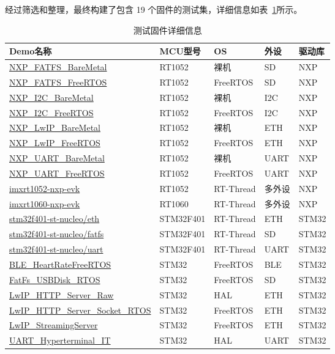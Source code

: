 经过筛选和整理，最终构建了包含 19 个固件的测试集，详细信息如表~\ref{tab:firmware}所示。

\begin{table}[htbp]
\centering
\caption{测试固件详细信息}
\label{tab:firmware}
\scriptsize
\begin{tabularx}{\textwidth}{>{\raggedright\arraybackslash}X p{2.0cm} p{1.5cm} >{\raggedright\arraybackslash}p{1.5cm} >{\raggedright\arraybackslash}p{1.5cm}}
\toprule
\textbf{Demo名称} & \textbf{MCU型号} & \textbf{OS} & \textbf{外设} & \textbf{驱动库} \\
\midrule
\url{NXP_FATFS_BareMetal} & RT1052 & 裸机 & SD & NXP \\
\url{NXP_FATFS_FreeRTOS} & RT1052 & FreeRTOS & SD & NXP \\
\url{NXP_I2C_BareMetal} & RT1052 & 裸机 & I2C & NXP \\
\url{NXP_I2C_FreeRTOS} & RT1052 & FreeRTOS & I2C & NXP \\
\url{NXP_LwIP_BareMetal} & RT1052 & 裸机 & ETH & NXP \\
\url{NXP_LwIP_FreeRTOS} & RT1052 & FreeRTOS & ETH & NXP \\
\url{NXP_UART_BareMetal} & RT1052 & 裸机 & UART & NXP \\
\url{NXP_UART_FreeRTOS} & RT1052 & FreeRTOS & UART & NXP \\
\url{imxrt1052-nxp-evk} & RT1052 & RT-Thread & 多外设 & NXP \\
\url{imxrt1060-nxp-evk} & RT1060 & RT-Thread & 多外设 & NXP \\
\url{stm32f401-st-nucleo/eth} & STM32F401 & RT-Thread & ETH & STM32 \\
\url{stm32f401-st-nucleo/fatfs} & STM32F401 & RT-Thread & SD & STM32 \\
\url{stm32f401-st-nucleo/uart} & STM32F401 & RT-Thread & UART & STM32 \\
\url{BLE_HeartRateFreeRTOS} & STM32 & FreeRTOS & BLE & STM32 \\
\url{FatFs_USBDisk_RTOS} & STM32 & FreeRTOS & SD & STM32 \\
\url{LwIP_HTTP_Server_Raw} & STM32 & HAL & ETH & STM32 \\
\url{LwIP_HTTP_Server_Socket_RTOS} & STM32 & FreeRTOS & ETH & STM32 \\
\url{LwIP_StreamingServer} & STM32 & FreeRTOS & ETH & STM32 \\
\url{UART_Hyperterminal_IT} & STM32 & HAL & UART & STM32 \\
\bottomrule
\end{tabularx}
\end{table}

